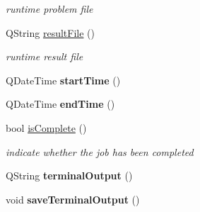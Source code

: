 \begin{DoxyCompactItemize}
\begin{DoxyCompactList}\small\item\em runtime problem file \end{DoxyCompactList}\item 
Q\+String \hyperlink{classprim_1_1SimJob_a12df9e7a65e6c864ff2a91672f3fba53}{result\+File} ()\hypertarget{classprim_1_1SimJob_a12df9e7a65e6c864ff2a91672f3fba53}{}\label{classprim_1_1SimJob_a12df9e7a65e6c864ff2a91672f3fba53}

\begin{DoxyCompactList}\small\item\em runtime result file \end{DoxyCompactList}\item 
Q\+Date\+Time {\bfseries start\+Time} ()\hypertarget{classprim_1_1SimJob_a64e8bbf8fb12e98f1584a17bd9760a0b}{}\label{classprim_1_1SimJob_a64e8bbf8fb12e98f1584a17bd9760a0b}

\item 
Q\+Date\+Time {\bfseries end\+Time} ()\hypertarget{classprim_1_1SimJob_a66895677e928d4ea5db6f4a10d99246d}{}\label{classprim_1_1SimJob_a66895677e928d4ea5db6f4a10d99246d}

\item 
bool \hyperlink{classprim_1_1SimJob_a104d97f00935c03f3aa3c8a62692052c}{is\+Complete} ()\hypertarget{classprim_1_1SimJob_a104d97f00935c03f3aa3c8a62692052c}{}\label{classprim_1_1SimJob_a104d97f00935c03f3aa3c8a62692052c}

\begin{DoxyCompactList}\small\item\em indicate whether the job has been completed \end{DoxyCompactList}\item 
Q\+String {\bfseries terminal\+Output} ()\hypertarget{classprim_1_1SimJob_a698eae60fc2798221cb042e5253092c3}{}\label{classprim_1_1SimJob_a698eae60fc2798221cb042e5253092c3}

\item 
void {\bfseries save\+Terminal\+Output} ()\hypertarget{classprim_1_1SimJob_a676ceb636f8cbbd55cecf99e98e9659c}{}\label{classprim_1_1SimJob_a676ceb636f8cbbd55cecf99e98e9659c}

\end{DoxyCompactItemize}
